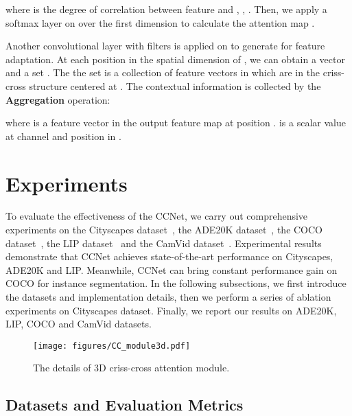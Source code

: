 \documentclass[10pt,journal,compsoc]{IEEEtran}
\begin{document}
where  is the degree of correlation between feature  and , , . Then, we apply a softmax layer on  over the first dimension to calculate the attention map .

Another convolutional layer with  filters is applied on  to generate  for feature adaptation.
At each position  in the spatial dimension of , we can obtain a vector  and a set . The the set  is a collection of feature vectors in   which are in the criss-cross structure centered at .
The contextual information is collected by the \textbf{Aggregation} operation:
    
where  is a feature vector in the output feature map  at position .  is a scalar value at channel  and position  in .

\section{Experiments} \label{Experiments}
To evaluate the effectiveness of the CCNet, we carry out comprehensive experiments on the Cityscapes dataset~\cite{cordts2016cityscapes}, the ADE20K dataset~\cite{zhou2017scene}, the COCO dataset~\cite{lin2014microsoft}, the LIP dataset~\cite{liang2018look} and the CamVid dataset~\cite{brostow2008segmentation}.  Experimental results demonstrate that CCNet achieves state-of-the-art performance on Cityscapes, ADE20K and LIP. Meanwhile, CCNet can bring constant performance gain on COCO for instance segmentation. 
In the following subsections, we first introduce the datasets and implementation details, then we perform a series of ablation experiments on Cityscapes dataset. Finally, we report our results on ADE20K, LIP, COCO and CamVid datasets.

\begin{figure}[!tp]
    \centering
    \texttt{[image: figures/CC\_module3d.pdf]}
    \caption{The details of 3D criss-cross attention module.}
    \label{fig:cca_module3d}
\end{figure}

\subsection{Datasets and Evaluation Metrics}
\end{document}
